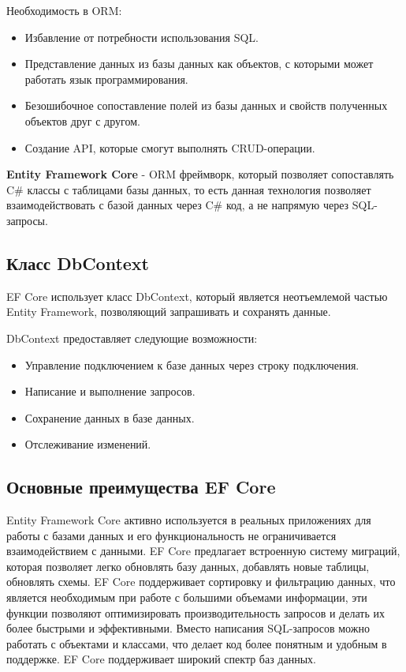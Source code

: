 \documentclass[a4paper,12pt]{report}
\begin{document}
Необходимость в ORM:
\begin{itemize}
    \item
        Избавление от потребности использования SQL.
    \item
        Представление данных из базы данных как объектов, с которыми может работать язык программирования.
    \item
        Безошибочное сопоставление полей из базы данных и свойств полученных объектов друг с другом.
    \item
        Создание API, которые смогут выполнять CRUD-операции.
\end{itemize}

\textbf{Entity Framework Core} - \acs{ORM} фреймворк, который позволяет сопоставлять C\# классы с таблицами базы данных, 
то есть данная технология позволяет взаимодействовать с базой данных через C\# код, а не напрямую через \acs{SQL}-запросы.


\subsection{Класс DbContext}

\acs{EF} Core использует класс DbContext, который является неотъемлемой частью Entity Framework, позволяющий запрашивать и сохранять данные. 

DbContext предоставляет следующие возможности:
\begin{itemize}
    \item
        Управление подключением к базе данных через строку подключения.
    \item 
        Написание и выполнение запросов.
    \item
        Сохранение данных в базе данных.
    \item
        Отслеживание изменений.
\end{itemize}

\subsection{Основные преимущества \acs{EF} Core}

Entity Framework Core активно используется в реальных приложениях для работы с базами данных и его функциональность 
не ограничивается взаимодействием с данными. \acs{EF} Core предлагает встроенную систему миграций, которая позволяет легко 
обновлять базу данных, добавлять новые таблицы, обновлять схемы. \acs{EF} Core поддерживает сортировку и фильтрацию данных, 
что является необходимым при работе с большими объемами информации, эти функции позволяют оптимизировать производительность 
запросов и делать их более быстрыми и эффективными. Вместо написания \acs{SQL}-запросов можно работать с объектами и классами, 
что делает код более понятным и удобным в поддержке. \acs{EF} Core поддерживает широкий спектр баз данных.
\end{document}
